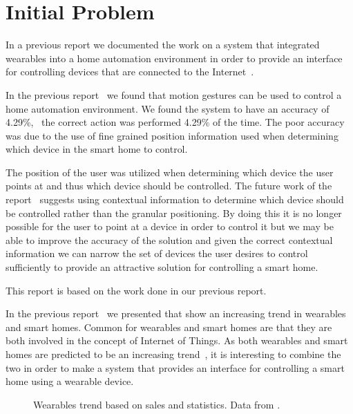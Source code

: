 \section{Initial Problem}
\label{sec:initproblem}

In a previous report we documented the work on a system that integrated wearables into a home automation environment in order to provide an interface for controlling devices that are connected to the Internet~\cite{prespecialisation}. 

In the previous report~\cite[pp. 69-73]{prespecialisation} we found that motion gestures can be used to control a home automation environment. We found the system to have an accuracy of 4.29\%, \ie~the correct action was performed 4.29\% of the time. The poor accuracy was due to the use of fine grained position information used when determining which device in the smart home to control.

The position of the user was utilized when determining which device the user points at and thus which device should be controlled. The future work of the report~\cite[pp. 71-73]{prespecialisation} suggests using contextual information to determine which device should be controlled rather than the granular positioning. By doing this it is no longer possible for the user to point at a device in order to control it but we may be able to improve the accuracy of the solution and given the correct contextual information we can narrow the set of devices the user desires to control sufficiently to provide an attractive solution for controlling a smart home.

This report is based on the work done in our previous report.

In the previous report~\cite[pp. 1-4]{prespecialisation} we presented  that show an increasing trend in wearables and smart homes. Common for wearables and smart homes are that they are both involved in the concept of Internet of Things. As both wearables and smart homes are predicted to be an increasing trend~\cite{WEARABLESTRENDNUMBERS,SMARTHOMETREND}, it is interesting to combine the two in order to make a system that provides an interface for controlling a smart home using a wearable device.

\begin{figure}[!hbt]
  \centering
  
  \caption{Wearables trend based on sales and statistics. Data from \protect\cite{WEARABLESTRENDNUMBERS}.}
  \label{fig:wearables-trend}
\end{figure}

